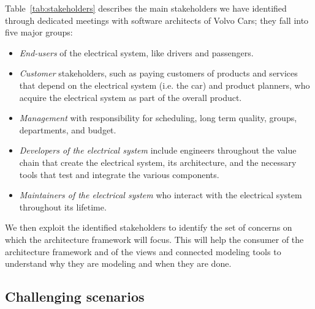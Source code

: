 Table~\ref{tab:stakeholders} describes the main stakeholders we have identified through dedicated meetings with software architects of Volvo Cars; they fall into five major groups: 

\begin{itemize}
\item \emph{End-users} of the electrical system, like drivers and passengers.
\item \emph{Customer} stakeholders, such as paying customers of products and services that depend on the electrical system (i.e. the car) and product planners, who acquire the electrical system as part of the overall product.
\item \emph{Management} with responsibility for scheduling, long term quality, groups, departments, and budget.
\item \emph{Developers of the electrical system}  include engineers throughout the value chain that create the electrical system, its architecture, and the necessary tools  that test and integrate the various components. 
\item \emph{Maintainers of the electrical system} who interact with the electrical system throughout its lifetime. 
\end{itemize}


We then exploit the identified stakeholders to identify the set of concerns on which the architecture framework will focus.
This will help the consumer of the architecture framework and of the views and connected modeling tools to understand why
they are modeling and when they are done. 

\subsection{Challenging scenarios}

